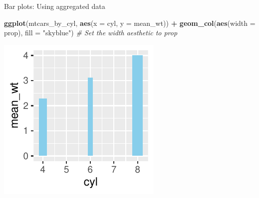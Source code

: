 \documentclass[
  ignorenonframetext,
]{beamer}
\newenvironment{Shaded}{\begin{snugshade}}{\end{snugshade}}
\newcommand{\AttributeTok}[1]{\textcolor[rgb]{0.13,0.29,0.53}{#1}}
\newcommand{\CommentTok}[1]{\textcolor[rgb]{0.56,0.35,0.01}{\textit{#1}}}
\newcommand{\FunctionTok}[1]{\textcolor[rgb]{0.13,0.29,0.53}{\textbf{#1}}}
\newcommand{\NormalTok}[1]{#1}
\newcommand{\SpecialCharTok}[1]{\textcolor[rgb]{0.81,0.36,0.00}{\textbf{#1}}}
\newcommand{\StringTok}[1]{\textcolor[rgb]{0.31,0.60,0.02}{#1}}
\begin{document}
\begin{frame}[fragile]{Bar plots: Using aggregated data}
\label{bar-plots-using-aggregated-data-7}

\begin{Shaded}
\begin{Highlighting}[]
\FunctionTok{ggplot}\NormalTok{(mtcars\_by\_cyl, }\FunctionTok{aes}\NormalTok{(}\AttributeTok{x =}\NormalTok{ cyl, }\AttributeTok{y =}\NormalTok{ mean\_wt)) }\SpecialCharTok{+} \FunctionTok{geom\_col}\NormalTok{(}\FunctionTok{aes}\NormalTok{(}\AttributeTok{width =}\NormalTok{ prop),}
    \AttributeTok{fill =} \StringTok{"skyblue"}\NormalTok{)  }\CommentTok{\# Set the width aesthetic to prop}
\end{Highlighting}
\end{Shaded}

\begin{center}\includegraphics[width=0.5\linewidth]{Figs/unnamed-chunk-111-1} \end{center}
\end{frame}
\end{document}
